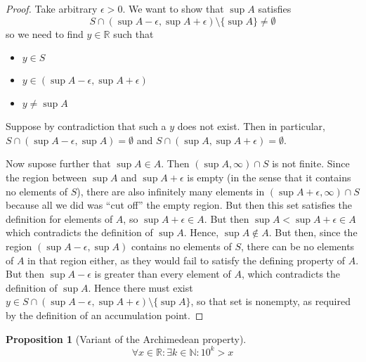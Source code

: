 \documentclass[letterpaper,11pt]{article}
\newtheorem{prop}{Proposition}
\newcommand{\N}{\mathbb{N}}
\newcommand{\R}{\mathbb{R}}
\begin{document}
\begin{proof}
    Take arbitrary $\epsilon > 0$. We want to show that $\sup{A}$ satisfies
    \begin{equation*}
        S \cap (\sup{A} - \epsilon, \sup{A} + \epsilon) \setminus \{\sup{A}\}
        \neq \emptyset
    \end{equation*}
    so we need to find $y \in \R$ such that
    \begin{itemize}
        \item $y \in S$
        \item $y \in (\sup{A} - \epsilon, \sup{A} + \epsilon)$
        \item $y \neq \sup{A}$
    \end{itemize}

    Suppose by contradiction that such a $y$ does not exist. Then in
    particular, $S \cap (\sup{A} - \epsilon, \sup{A}) = \emptyset$ and
    $S \cap (\sup{A}, \sup{A} + \epsilon) = \emptyset$.

    Now supose further that $\sup{A} \in A$.
    Then $(\sup{A}, \infty) \cap S$ is not finite.
    Since the region between $\sup{A}$ and $\sup{A} + \epsilon$ is empty (in
    the sense that it contains no elements of $S$), there are also infinitely
    many elements in $(\sup{A} + \epsilon, \infty) \cap S$ because all we did
    was ``cut off'' the empty region. But then this set satisfies the
    definition for elements of $A$, so $\sup{A} + \epsilon \in A$.
    But then
    $\sup{A} < \sup{A} + \epsilon \in A$ which
    contradicts the definition of $\sup{A}$. Hence, $\sup{A} \notin A$.
    But then, since the region $(\sup{A} - \epsilon, \sup{A})$ contains no
    elements of $S$, there can be no elements of $A$ in that region either, as
    they would fail to satisfy the defining property of $A$.
    But then
    $\sup{A} - \epsilon$ is greater than every element of $A$, which
    contradicts the definition of $\sup{A}$. Hence there must exist
    $y \in S
    \cap (\sup{A} - \epsilon, \sup{A} + \epsilon) \setminus \{\sup{A}\}$,
    so that set is nonempty, as required by the definition of an accumulation
    point.
\end{proof}

\begin{prop}[Variant of the Archimedean property]
    \begin{equation*}
        \forall x \in \R: \exists k \in \N: 10^k > x
    \end{equation*}
\end{prop}
\end{document}
